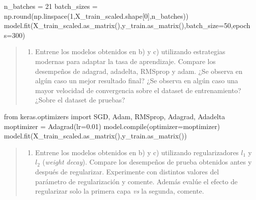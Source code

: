 \documentclass[11pt]{article}
\providecommand{\tightlist}{%
      \setlength{\itemsep}{0pt}\setlength{\parskip}{0pt}}
\newenvironment{Shaded}{}{}
\newcommand{\DecValTok}[1]{\textcolor[rgb]{0.25,0.63,0.44}{{#1}}}
\newcommand{\FloatTok}[1]{\textcolor[rgb]{0.25,0.63,0.44}{{#1}}}
\newcommand{\NormalTok}[1]{{#1}}
\newcommand{\ImportTok}[1]{{#1}}
\newcommand{\OperatorTok}[1]{\textcolor[rgb]{0.40,0.40,0.40}{{#1}}}
\newcommand{\BuiltInTok}[1]{{#1}}
\begin{document}
\begin{Shaded}
\begin{Highlighting}[]
\NormalTok{n_batches }\OperatorTok{=} \DecValTok{21}
\NormalTok{batch_sizes }\OperatorTok{=}\NormalTok{ np.}\BuiltInTok{round}\NormalTok{(np.linspace(}\DecValTok{1}\NormalTok{,X_train_scaled.shape[}\DecValTok{0}\NormalTok{],n_batches))}
\NormalTok{model.fit(X_train_scaled.as_matrix(),y_train.as_matrix(),batch_size}\OperatorTok{=}\DecValTok{50}\NormalTok{,epochs}\OperatorTok{=}\DecValTok{300}\NormalTok{)}
\end{Highlighting}
\end{Shaded}

    \begin{quote}
\begin{enumerate}
\def\labelenumi{\alph{enumi})}
\setcounter{enumi}{6}
\tightlist
\item
  Entrene los modelos obtenidos en b) y c) utilizando estrategias
  modernas para adaptar la tasa de aprendizaje. Compare los desempeños
  de adagrad, adadelta, RMSprop y adam. ¿Se observa en algún caso un
  mejor resultado final? ¿Se observa en algún caso una mayor velocidad
  de convergencia sobre el dataset de entrenamiento? ¿Sobre el dataset
  de pruebas?
\end{enumerate}
\end{quote}

\begin{Shaded}
\begin{Highlighting}[]
\ImportTok{from}\NormalTok{ keras.optimizers }\ImportTok{import}\NormalTok{ SGD, Adam, RMSprop, Adagrad, Adadelta}
\NormalTok{moptimizer }\OperatorTok{=}\NormalTok{ Adagrad(lr}\OperatorTok{=}\FloatTok{0.01}\NormalTok{)}
\NormalTok{model.}\BuiltInTok{compile}\NormalTok{(optimizer}\OperatorTok{=}\NormalTok{moptimizer)}
\NormalTok{model.fit(X_train_scaled.as_matrix(),y_train.as_matrix())}
\end{Highlighting}
\end{Shaded}

    \begin{quote}
\begin{enumerate}
\def\labelenumi{\alph{enumi})}
\setcounter{enumi}{7}
\tightlist
\item
  Entrene los modelos obtenidos en b) y c) utilizando regularizadores
  \(l_1\) y \(l_2\) (\emph{weight decay}). Compare los desempeños de
  prueba obtenidos antes y después de regularizar. Experimente con
  distintos valores del parámetro de regularización y comente. Además
  evalúe el efecto de regularizar solo la primera capa \emph{vs} la
  segunda, comente.
\end{enumerate}
\end{quote}
\end{document}
